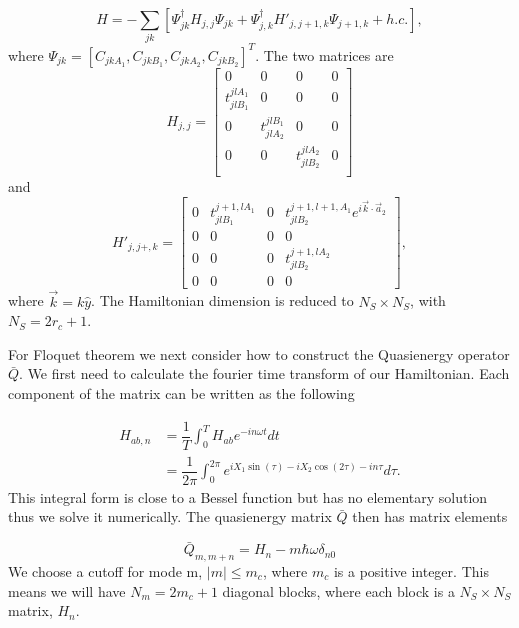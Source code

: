 \begin{equation}
  H = -\sum_{jk} \left[ \Psi^{\dagger}_{jk} H_{j,j} \Psi_{jk} + \Psi^{\dagger}_{j,k} H'_{j,j+1,k} \Psi_{j+1,k} + h.c. \right],
\end{equation}
where $\Psi_{jk} = [C_{jkA_1}, C_{jkB_1}, C_{jkA_2}, C_{jkB_2}]^T$. The two matrices are
\[
  H_{j,j} =
  \begin{bmatrix}
    0 & 0 & 0 & 0 \\
    t^{jlA_1}_{jlB_1} & 0 & 0 & 0 \\
    0 & t^{jlB_1}_{jlA_2} & 0 & 0 \\
    0 & 0 & t^{jlA_2}_{jlB_2} & 0 \\
  \end{bmatrix}
\]
and
\[
  H'_{j,j+,k} =
  \begin{bmatrix}
    0 & t^{j+1,lA_1}_{jlB_1} & 0 & t^{j+1,l+1,A_1}_{jlB_2} e^{i\vec{k}\cdot\vec{a}_2} \\
    0 & 0 & 0 & 0 \\
    0 & 0 & 0 & t^{j+1,lA_2}_{jlB_2} \\
    0 & 0 & 0 & 0
  \end{bmatrix},
\]
where $\vec{k} = k \hat{y}$.
The Hamiltonian dimension is reduced to $N_S \times N_S$, with $N_S = 2r_c+1$.

For Floquet theorem we next consider how to construct the Quasienergy operator $\bar{Q}$.
We first need to calculate the fourier time transform of our Hamiltonian.
Each component of the matrix can be written as the following

\begin{align}
  H_{ab, n} &= \dfrac{1}{T} \int^T_0 H_{ab} e^{-i n \omega t} dt \nonumber \\
  &= \dfrac{1}{2\pi} \int^{2\pi}_0 e^{iX_1\sin(\tau) - iX_2\cos(2\tau) - i n \tau} d\tau.
\end{align}
This integral form is close to a Bessel function but has no elementary solution thus we solve it numerically.
The quasienergy matrix $\bar{Q}$ then has matrix elements

\begin{equation}
  \bar{Q}_{m,m+n} = H_n - m \hbar \omega \delta_{n0}
\end{equation}
We choose a cutoff for mode m, $|m| \leq m_c$, where $m_c$ is a positive integer.
This means we will have $N_m = 2 m_c +1$ diagonal blocks, where each block is a $N_S \times N_S$ matrix, $H_n$.


